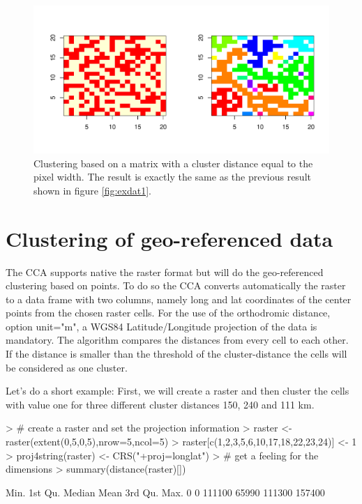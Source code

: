 \documentclass[10pt,a4paper]{article}
\begin{document}
\begin{figure}
\centering
\includegraphics{pics/exdat2.pdf}
\caption{Clustering based on a matrix with a cluster distance equal to the pixel width. The result is exactly the same as the previous result shown in figure \ref{fig:exdat1}.}
\label{fig:exdat2}
\end{figure}



\section{Clustering of geo-referenced data}

The CCA supports native the raster format but will do the geo-referenced clustering based on points. To do so the CCA converts automatically the raster to a data frame with two columns, namely long and lat coordinates of the center points from the chosen raster cells. For the use of the orthodromic distance, option unit="m", a WGS84 Latitude/Longitude projection of the data is mandatory. The algorithm compares the distances from every cell to each other. If the distance is smaller than the threshold of the cluster-distance the cells will be considered as one cluster.

Let's do a short example: First, we will create a raster and then cluster the cells with value one for three different cluster distances 150, 240 and 111 km.

\begin{Schunk}
\begin{Sinput}
> # create a raster and set the projection information
> raster <- raster(extent(0,5,0,5),nrow=5,ncol=5)
> raster[c(1,2,3,5,6,10,17,18,22,23,24)] <- 1
> proj4string(raster) <- CRS("+proj=longlat")
> # get a feeling for the dimensions
> summary(distance(raster)[])
\end{Sinput}
\begin{Soutput}
   Min. 1st Qu.  Median    Mean 3rd Qu.    Max. 
      0       0  111100   65990  111300  157400 
\end{Soutput}
\end{Schunk}
\end{document}
